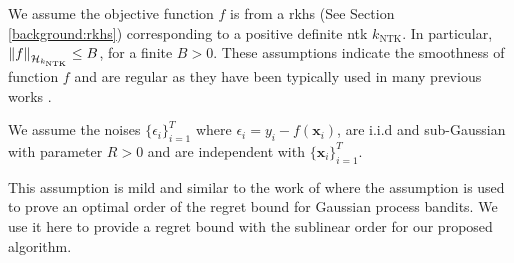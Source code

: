 \begin{assumption}
    We assume the objective function $f$ is from a \ac{rkhs} (See Section \ref{background:rkhs}) corresponding to a positive definite \ac{ntk}  $k_\text{NTK}$. In particular, $\norm{f}_{\mathcal{H}_{k_\text{NTK}}} \leq B$, for a finite $B > 0$. These assumptions indicate the smoothness of function $f$ and are regular as they have been typically used in many previous works \citep{chowdhury2017kernelized, srinivas2009gaussian,vakili2021information}.
\end{assumption}
\begin{assumption}
\label{assumption:iid_noise}
We assume the noises $\{\epsilon_i\}_{i=1}^T$ where $\epsilon_i = y_i - f(\mathbf{x}_i)$, are i.i.d and sub-Gaussian with parameter $R > 0$ and are independent with $\{\mathbf{x}_i\}_{i=1}^T$. 
\end{assumption} 
This assumption is mild and similar to the work of \citet{vakili2021optimal} where the assumption is used to prove an optimal order of the regret bound for Gaussian process bandits. We use it here to provide a regret bound with the sublinear order for our proposed algorithm.    

